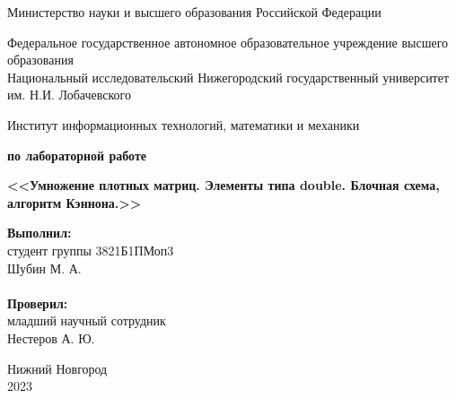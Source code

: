 \documentclass{report}
\begin{document}
\begin{titlepage}

\begin{center}
Министерство науки и высшего образования Российской Федерации
\end{center}

\begin{center}
Федеральное государственное автономное образовательное учреждение высшего образования\\Национальный исследовательский Нижегородский государственный университет им. Н.И. Лобачевского
\end{center}

\begin{center}
Институт информационных технологий, математики и механики
\end{center}

\vspace{4em}

\begin{center}
\textbf{ по лабораторной работе}\\
\end{center}
\begin{center}
\textbf{\Large<<Умножение плотных матриц. Элементы типа double. Блочная схема, алгоритм Кэннона.>>}\\
\end{center}

\vspace{4em}

\newbox{\lbox}
\newlength{\maxl}
\setlength{\maxl}{\wd\lbox}
\hfill\parbox{7cm}{
\hspace*{5cm}\hspace*{-5cm}\textbf{Выполнил:}\\студент группы 3821Б1ПМоп3\\Шубин М. А.\\
\\
\hspace*{5cm}\hspace*{-5cm}\textbf{Проверил:}\\младший научный сотрудник\\Нестеров А. Ю.\\
}
\vspace{\fill}

\begin{center}Нижний Новгород\\2023\end{center}

\end{titlepage}
\end{document}
